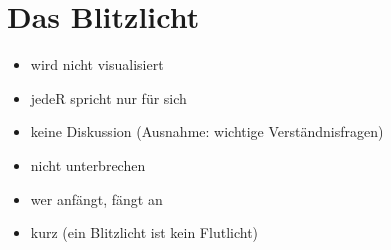 \section{Das Blitzlicht}

\begin{itemize}
  \item wird nicht visualisiert
  \item jedeR spricht nur für sich
  \item keine Diskussion (Ausnahme: wichtige Verständnisfragen)
  \item nicht unterbrechen
  \item wer anfängt, fängt an
  \item kurz (ein Blitzlicht ist kein Flutlicht)
\end{itemize}